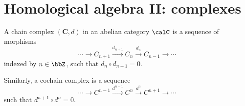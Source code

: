 




\section{Homological algebra II: complexes}

\begin{defn}
    A chain complex $(\bm{C},d)$ in an abelian category $\calC$ is a sequence  of morphisms 
    \[\cdots\to C_{n+1}\overset{d_{n+1}}\to C_n\overset{d_n}\to C_{n-1}\to\cdots\]
    indexed by $n\in \bbZ$, such that $d_n\circ d_{n+1}=0$.
    
    Similarly, a cochain complex is a sequence
    \[\cdots\to C^{n-1}\overset{d^{n-1}}\to C^n\overset{d^n}\to C^{n+1}\to\cdots\]
    such that $d^{n+1}\circ d^n=0$.
\end{defn}


